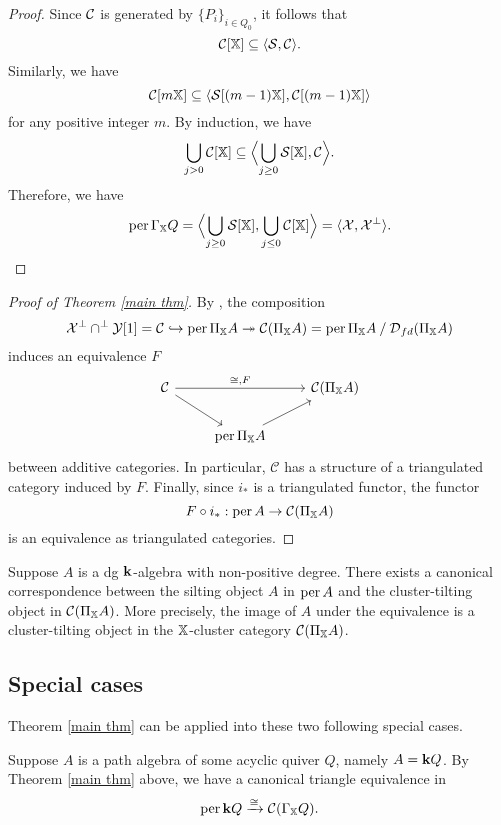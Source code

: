 \begin{proof}
  Since $\operatorname{\mathcal{C}}$ is generated by $\{P_i\}_{i \in Q_0}$, it follows that
  \[ \operatorname{\mathcal{C}}[\mathbb{X}] \subseteq \langle \mathcal{S}, \operatorname{\mathcal{C}} \rangle. \]
  Similarly, we have
  \[ \operatorname{\mathcal{C}}[m\mathbb{X}] \subseteq \langle \mathcal{S}[(m-1)\mathbb{X}], \operatorname{\mathcal{C}}[(m-1)\mathbb{X}] \rangle \]
  for any positive integer $m$.
  By induction, we have
  \[
    \bigcup_{j>0} \operatorname{\mathcal{C}}[\mathbb{X}]
    \subseteq \Bigl\langle \bigcup_{j \geq 0} \mathcal{S}[\mathbb{X}], \operatorname{\mathcal{C}} \Bigr\rangle.
  \]
  Therefore, we have
  \[
    \operatorname{per}\Gamma_{\mathbb{X}}Q
    = \Bigl\langle \bigcup_{j \geq 0}\mathcal{S}[\mathbb{X}], \bigcup_{j \leq 0}\operatorname{\mathcal{C}}[\mathbb{X}] \Bigr\rangle
    = \langle \mathcal{X}, \mathcal{X}^\bot \rangle. \qedhere
  \]
\end{proof}

\begin{proof}[Proof of Theorem \ref{main thm}]
  By \cite[Theorem 1.1]{IY}, the composition
  \[
    \mathcal{X}^{\bot} \cap ^{\bot}\mathcal{Y}[1]
    = \mathcal{C} \hookrightarrow \operatorname{per}\Pi_{\mathbb{X}}A
      \twoheadrightarrow \mathcal{C}(\Pi_{\mathbb{X}}A)
    = \operatorname{per} \Pi_{\mathbb{X}}A \mathbin{/} \operatorname{\mathcal{D}}_{fd}(\Pi_{\mathbb{X}}A)
  \]
  induces an equivalence $F$
  \[
    \begin{tikzcd}
      \mathcal{C} \ar[dr] \ar[rr, "{\cong, F}"]
      & & \mathcal{C}(\Pi_{\XX}A) \\
      &\per\Pi_{\XX} A\ar[ur]
    \end{tikzcd}
  \]
  between additive categories.
  In particular,
  $\mathcal{C}$ has a structure of a triangulated category induced by $F$.
  Finally, since $i_*$ is a triangulated functor, the functor
  \[ F\circ i_*: \operatorname{per} A \to \mathcal{C}(\Pi_{\mathbb{X}}A) \]
  is an equivalence as triangulated categories.
\end{proof}

\begin{remark}
  Suppose $A$ is a dg $\mathbf{k}$-algebra with non-positive degree.
  There exists a canonical correspondence
  between the silting object $A$ in $\operatorname{per} A$
  and the cluster-tilting object in $\mathcal{C}(\Pi_{\mathbb{X}}A)$.
  More precisely, the image of $A$ under the equivalence
  is a cluster-tilting object
  in the $\mathbb{X}$-cluster category $\mathcal{C}(\Pi_{\mathbb{X}}A)$.
\end{remark}

\subsection{Special cases}
Theorem \ref{main thm} can be applied into these two following special cases.

\begin{example}\cite{Q1}
  Suppose $A$ is a path algebra of some acyclic quiver $Q$, namely $A =\mathbf{k} Q$.
  By Theorem \ref{main thm} above,
  we have a canonical triangle equivalence in \cite[Theorem 6.7]{Q1}
  \[ \operatorname{per} \mathbf{k} Q \xrightarrow{\cong} \operatorname{\mathcal{C}}(\Gamma_{\mathbb{X}}Q). \]
\end{example}

